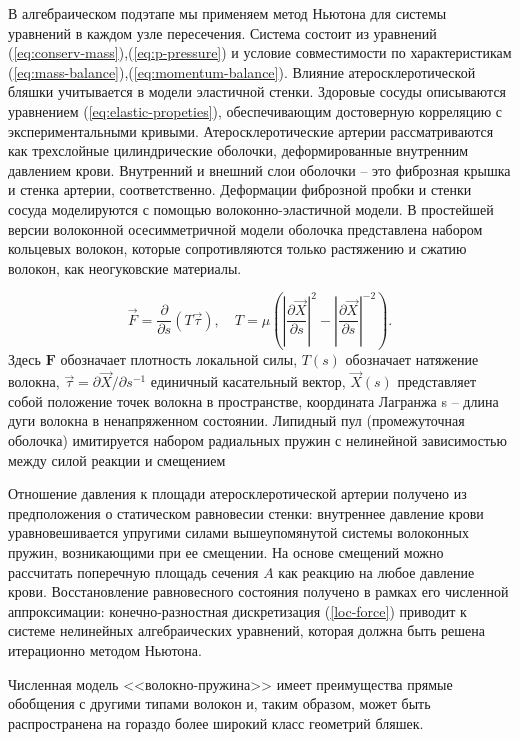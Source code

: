 В алгебраическом подэтапе мы применяем метод Ньютона для системы уравнений в каждом узле пересечения. 
Система состоит из уравнений (\ref{eq:conserv-mass}),(\ref{eq:p-pressure}) и условие совместимости по характеристикам (\ref{eq:mass-balance}),(\ref{eq:momentum-balance}). 
Влияние атеросклеротической бляшки учитывается в модели эластичной стенки. Здоровые сосуды описываются уравнением (\ref{eq:elastic-propeties}), 
обеспечивающим достоверную корреляцию с экспериментальными кривыми. Атеросклеротические артерии рассматриваются как 
трехслойные цилиндрические оболочки, деформированные внутренним давлением крови. Внутренний и внешний слои оболочки -- это 
фиброзная крышка и стенка артерии, соответственно. Деформации фиброзной пробки и стенки сосуда моделируются с помощью 
волоконно-эластичной модели. В простейшей версии волоконной осесимметричной модели оболочка представлена набором кольцевых волокон, 
которые сопротивляются только растяжению и сжатию волокон, как неогуковские материалы.

\begin{equation}
    \label{loc-force}
    \vec{F}=\frac{\partial}{\partial s}(T\vec{\tau}),
    \quad
    T=\mu\left(\left|\frac{\partial \vec{X}}{\partial s}\right|^2-\left|\frac{\partial \Vec{X}}{\partial s}\right|^{-2}\right).
\end{equation}
Здесь $\mathbf{F}$ обозначает плотность локальной силы, $T(s)$ обозначает натяжение волокна, 
$\Vec{\tau} =\partial \Vec{X}/\partial s^{-1}$ единичный касательный вектор, $\Vec{X}(s)$ 
представляет собой положение точек волокна в пространстве, координата Лагранжа s -- длина дуги волокна в ненапряженном состоянии. 
Липидный пул (промежуточная оболочка) имитируется набором радиальных пружин с нелинейной зависимостью между силой реакции и смещением

Отношение давления к площади атеросклеротической артерии получено из предположения о статическом равновесии стенки: 
внутреннее давление крови уравновешивается упругими силами вышеупомянутой системы волоконных пружин, возникающими при ее смещении. 
На основе смещений можно рассчитать поперечную площадь сечения $A$ как реакцию на любое давление крови. 
Восстановление равновесного состояния получено в рамках его численной аппроксимации: конечно-разностная дискретизация (\ref{loc-force}) 
приводит к системе нелинейных алгебраических уравнений, которая должна быть решена итерационно методом Ньютона.

Численная модель <<волокно-пружина>> имеет преимущества прямые обобщения с другими типами волокон и, таким образом, 
может быть распространена на гораздо более широкий класс геометрий бляшек.

